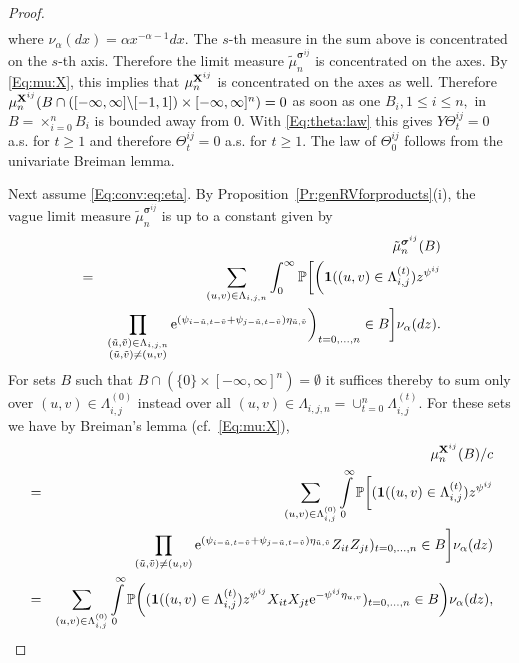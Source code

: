 \begin{proof}
\begin{eqnarray*}
\end{eqnarray*}
where $\nu_\alpha(dx)=\alpha x^{-\alpha-1}dx$. 
The $s$-th measure in the sum above is concentrated on the $s$-th axis. Therefore the limit measure $\tilde{\mu}^{\boldsymbol{\sigma}^{ij}}_n$ is
concentrated on the axes.
By \eqref{Eq:mu:X}, this implies that $\mu_n^{{\bf X}^{ij}}$ is concentrated on the axes as well. Therefore
$\mu_n^{{\bf X}^{ij}}(B \cap ([-\infty,\infty]\backslash [-1,1])\times [-\infty,\infty]^n)=0$ as soon as one $B_i, 1 \leq i \leq n,$ in $B=\times_{i=0}^n B_i$ is bounded away from 0. 
With \eqref{Eq:theta:law} this gives $Y \Theta_t^{ij}=0$ a.s. for $t \geq 1$ and therefore $\Theta_t^{ij}=0$ a.s. for $t \geq 1$. 
The law of $\Theta_0^{ij}$ follows from the univariate Breiman lemma. 
\par
Next assume \eqref{Eq:conv:eq:eta}. By Proposition~\ref{Pr:genRVforproducts}(i),  
the vague limit measure $\tilde{\mu}^{\boldsymbol{\sigma}^{ij}}_n$ is up to a constant given by 
\begin{eqnarray*}
  && \tilde{\mu}^{\boldsymbol{\sigma}^{ij}}_n(B) \\
  &=& \sum_{(u,v) \in \Lambda_{i,j,n}}\int_0^\infty {\mathbb P}\bigg[\bigg(\mathbf{1}((u,v) \in \Lambda_{i,j}^{(t)})z^{\psi^{ij}} \\
  && \prod_{\substack{(\tilde{u},\tilde{v}) \in \Lambda_{i,j,n} \\ (\tilde{u},\tilde{v}) \neq (u,v)}}{\rm e}^{(\psi_{i-\tilde{u},t-\tilde{v}}+\psi_{j-\tilde{u},t-\tilde{v}})\eta_{\tilde{u},\tilde{v}}}\bigg)_{t=0, \ldots ,n} \in B \bigg]\nu_{\alpha}(dz).
\end{eqnarray*}                                                                                                
For sets $B$ such that $B \cap (\{0\} \times [-\infty,\infty]^n)=\emptyset$ it suffices thereby to sum only 
over  $(u,v) \in \Lambda_{i,j}^{(0)}$ instead over all $(u,v) \in \Lambda_{i,j,n}=\cup_{t=0}^n\Lambda_{i,j}^{(t)}$.
For these sets we have by Breiman's lemma (cf.\ \eqref{Eq:mu:X}),
\begin{eqnarray*}
  && \mu^{\bfX^{ij}}_n(B)/c\\
  &=&
  \sum_{(u,v) \in \Lambda_{i,j}^{(0)}}\int\limits_0^\infty \P\bigg[(\I((u,v) \in \Lambda_{i,j}^{(t)})z^{\psi^{ij}} \\
  &&
  \prod\limits_{(\tilde{u},\tilde{v}) \neq (u,v)}\ex^{(\psi_{i-\tilde{u},t-\tilde{v}}+\psi_{j-\tilde{u},t-\tilde{v}})\eta_{\tilde{u},\tilde{v}}} Z_{it}Z_{jt})_{t=0, \ldots ,n} \in B \bigg]\nu_{\alpha}(dz)\\
  &=&
  \sum_{(u,v) \in \Lambda_{i,j}^{(0)}}\int\limits_0^\infty \P\bigg((\I((u,v) \in \Lambda_{i,j}^{(t)})z^{\psi^{ij}}X_{it}X_{jt}\ex^{-\psi^{ij}\eta_{u,v}})_{t=0, \ldots ,n} \in B \bigg)\nu_{\alpha}(dz),

\end{eqnarray*}
\end{proof}

